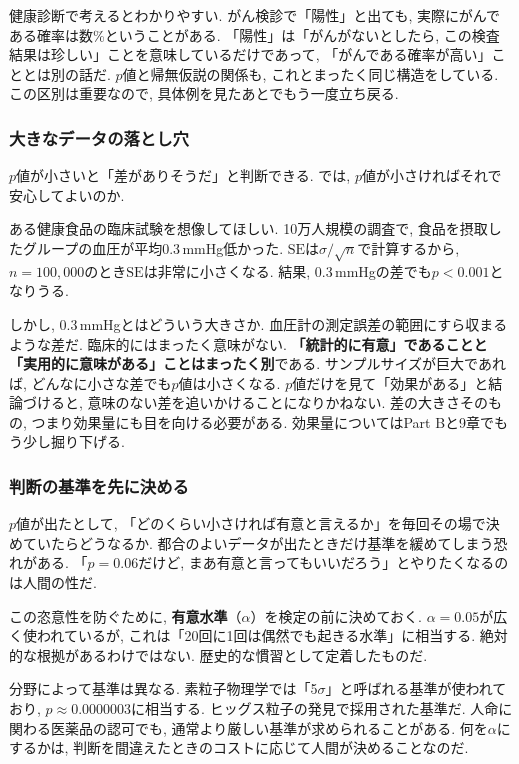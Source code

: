     健康診断で考えるとわかりやすい.
    がん検診で「陽性」と出ても, 実際にがんである確率は数\%ということがある.
    「陽性」は「がんがないとしたら, この検査結果は珍しい」ことを意味しているだけであって,
    「がんである確率が高い」こととは別の話だ.
    $p$値と帰無仮説の関係も, これとまったく同じ構造をしている.
    この区別は重要なので, 具体例を見たあとでもう一度立ち戻る.

    \subsubsection*{大きなデータの落とし穴}

    $p$値が小さいと「差がありそうだ」と判断できる.
    では, $p$値が小さければそれで安心してよいのか.

    ある健康食品の臨床試験を想像してほしい.
    10万人規模の調査で, 食品を摂取したグループの血圧が平均0.3\,mmHg低かった.
    $\mathrm{SE}$は$\sigma / \sqrt{n}$で計算するから, $n = 100{,}000$のとき$\mathrm{SE}$は非常に小さくなる.
    結果, 0.3\,mmHgの差でも$p < 0.001$となりうる.

    しかし, 0.3\,mmHgとはどういう大きさか.
    血圧計の測定誤差の範囲にすら収まるような差だ.
    臨床的にはまったく意味がない.
    \textbf{「統計的に有意」であることと「実用的に意味がある」ことはまったく別}である.
    サンプルサイズが巨大であれば, どんなに小さな差でも$p$値は小さくなる.
    $p$値だけを見て「効果がある」と結論づけると, 意味のない差を追いかけることになりかねない.
    差の大きさそのもの, つまり効果量にも目を向ける必要がある.
    効果量についてはPart Bと9章でもう少し掘り下げる.

    \subsubsection*{判断の基準を先に決める}

    $p$値が出たとして, 「どのくらい小さければ有意と言えるか」を毎回その場で決めていたらどうなるか.
    都合のよいデータが出たときだけ基準を緩めてしまう恐れがある.
    「$p = 0.06$だけど, まあ有意と言ってもいいだろう」とやりたくなるのは人間の性だ.

    この恣意性を防ぐために, \textbf{有意水準}（$\alpha$）を検定の前に決めておく.
    $\alpha = 0.05$が広く使われているが, これは「20回に1回は偶然でも起きる水準」に相当する.
    絶対的な根拠があるわけではない.
    歴史的な慣習として定着したものだ.

    分野によって基準は異なる.
    素粒子物理学では「5$\sigma$」と呼ばれる基準が使われており, $p \approx 0.0000003$に相当する.
    ヒッグス粒子の発見で採用された基準だ.
    人命に関わる医薬品の認可でも, 通常より厳しい基準が求められることがある.
    何を$\alpha$にするかは, 判断を間違えたときのコストに応じて人間が決めることなのだ.

